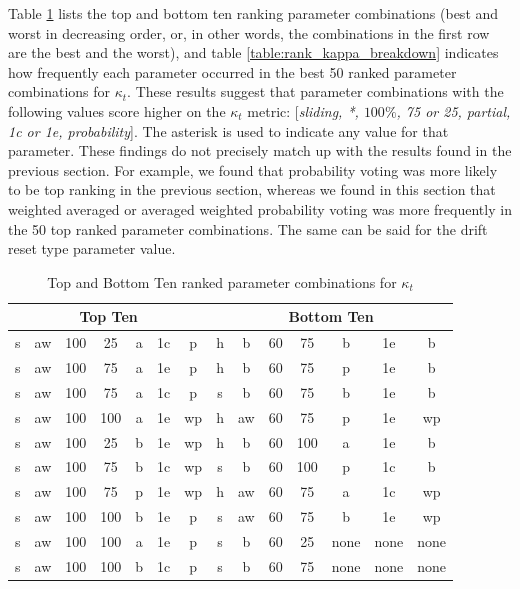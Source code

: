 Table \ref{table:rank_kappa_top_bottom_10} lists the top and bottom ten ranking parameter combinations (best and worst in decreasing order, or, in other words, the combinations in the first row are the best and the worst), and table \ref{table:rank_kappa_breakdown} indicates how frequently each parameter occurred in the best 50 ranked parameter combinations for $\kappa_t$. These results suggest that parameter combinations with the following values score higher on the $\kappa_t$ metric: [\textit{sliding, *, $100\%$, 75 or 25, partial, 1c or 1e, probability}]. The asterisk is used to indicate any value for that parameter.
These findings do not precisely match up with the results found in the previous section. For example, we found that probability voting was more likely to be top ranking in the previous section, whereas we found in this section that weighted averaged or averaged weighted probability voting was more frequently in the 50 top ranked parameter combinations. The same can be said for the drift reset type parameter value.

\begin{table}[]
\centering
\caption{\label{table:rank_kappa_top_bottom_10}Top and Bottom Ten ranked parameter combinations for $\kappa_t$}
\begin{tabular}{|c|c|c|c|c|c|c||c|c|c|c|c|c|c|}
\hline
\multicolumn{7}{|c||}{\textbf{Top Ten}} & \multicolumn{7}{c|}{\textbf{Bottom Ten}} \\ \hline \hhline{=======#=======}
s & aw & 100 & 25 & a & 1c & p & h & b & 60 & 75 & b & 1e & b \\ \hline
s & aw & 100 & 75 & a & 1e & p & h & b & 60 & 75 & p & 1e & b \\ \hline
s & aw & 100 & 75 & a & 1c & p & s & b & 60 & 75 & b & 1e & b \\ \hline
s & aw & 100 & 100 & a & 1e & wp & h & aw & 60 & 75 & p & 1e & wp \\ \hline
s & aw & 100 & 25 & b & 1e & wp & h & b & 60 & 100 & a & 1e & b \\ \hline
s & aw & 100 & 75 & b & 1c & wp & s & b & 60 & 100 & p & 1c & b \\ \hline
s & aw & 100 & 75 & p & 1e & wp & h & aw & 60 & 75 & a & 1c & wp \\ \hline
s & aw & 100 & 100 & b & 1e & p & s & aw & 60 & 75 & b & 1e & wp \\ \hline
s & aw & 100 & 100 & a & 1e & p & s & b & 60 & 25 & none & none & none \\ \hline
s & aw & 100 & 100 & b & 1c & p & s & b & 60 & 75 & none & none & none \\ \hline
\end{tabular}
\end{table}

